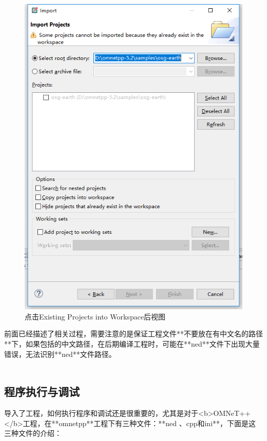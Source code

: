 \begin{figure}
	\centering
	\includegraphics[width=\textwidth]{../img/chapter2/ExistingProjects}
	\caption{点击Existing Projects into Workspace后视图}\label{fig:1a}
\end{figure}

	
前面已经描述了相关过程，需要注意的是保证工程文件**不要放在有中文名的路径**下，如果包括的中文路径，在后期编译工程时，可能在**ned**文件下出现大量错误，无法识别**ned**文件路径。\\ \\

\subsection{程序执行与调试}

导入了工程，如何执行程序和调试还是很重要的，尤其是对于<b>OMNeT++</b>工程，在**omnetpp**工程下有三种文件：**ned 、cpp和ini**，下面是这三种文件的介绍：

